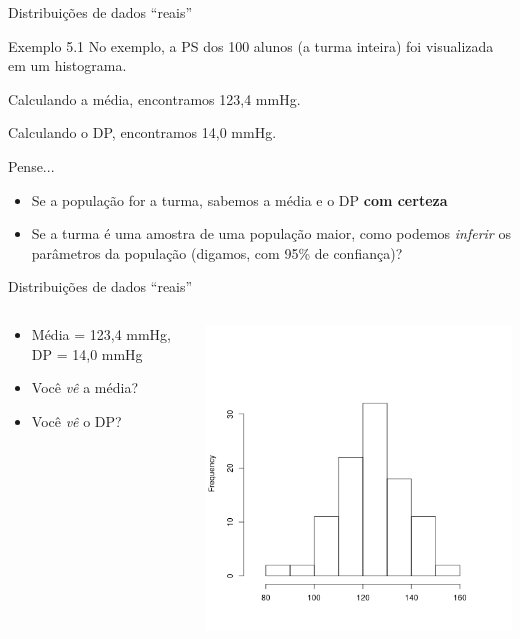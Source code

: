 \documentclass{beamer}
\begin{document}
\begin{frame}[label=exemplo5.1]{Distribuições de dados ``reais''}
  \begin{exampleblock}{Exemplo 5.1}
    No exemplo, a PS dos 100 alunos (a turma inteira) foi visualizada em um histograma.

    Calculando a média, encontramos 123,4 mmHg.

    Calculando o DP, encontramos 14,0 mmHg.
  \end{exampleblock}
  \begin{block}{Pense...}
    \begin{itemize}
    \item Se a população for a turma, sabemos a média e o DP {\bf com certeza}
    \item Se a turma é uma amostra de uma população maior, como podemos {\em inferir} os parâmetros da população (digamos, com 95\% de confiança)?
    \end{itemize}
  \end{block}
\end{frame}

\begin{frame}{Distribuições de dados ``reais''}
  \begin{columns}
    \begin{column}{5cm}
      \begin{itemize}
      \item Média = 123,4 mmHg, DP = 14,0 mmHg
      \item Você  {\em vê} a média?
      \item Você  {\em vê} o DP?
      \end{itemize}
    \end{column}
    \begin{column}{5cm}
      \includegraphics[width=\textwidth]{Cap4/normal1}
    \end{column}
  \end{columns}
\end{frame}
\end{document}
